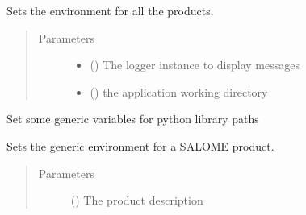 \documentclass[a4paper,10pt,english]{sphinxmanual}
\begin{document}
\begin{fulllineitems}
\begin{fulllineitems}
\label{\detokenize{commands/apidoc/src:src.environment.SalomeEnviron.set_products}}
Sets the environment for all the products.
\begin{quote}\begin{description}
\item[{Parameters}] \leavevmode\begin{itemize}
\item {} 
 () \textendash{} The logger instance to display messages

\item {} 
 () \textendash{} the application working directory

\end{itemize}

\end{description}\end{quote}

\end{fulllineitems}


\begin{fulllineitems}
\label{\detokenize{commands/apidoc/src:src.environment.SalomeEnviron.set_python_libdirs}}
Set some generic variables for python library paths

\end{fulllineitems}


\begin{fulllineitems}
\label{\detokenize{commands/apidoc/src:src.environment.SalomeEnviron.set_salome_generic_product_env}}
Sets the generic environment for a SALOME product.
\begin{quote}\begin{description}
\item[{Parameters}] \leavevmode
{} () \textendash{} The product description


\end{description}
\end{quote}
\end{fulllineitems}
\end{fulllineitems}
\end{document}
